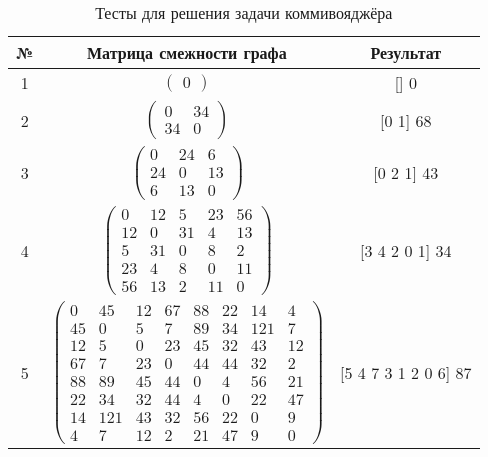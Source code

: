 \begin{table}[H]
  \caption{\label{table:tests} Тесты для решения задачи коммивояджёра}
  \begin{center}
    \begin{tabular}{|c|c|c|}
      \hline
      № &  Матрица смежности графа & Результат \\ \hline
      1 & $\begin{pmatrix}
      	0
      \end{pmatrix}$ & [] 0 \\ \hline
      2 & $\begin{pmatrix}
      	0 & 34 \\
      	34 & 0
      \end{pmatrix}$ & [0 1] 68 \\ \hline
      3 & $\begin{pmatrix}
      	0 & 24 & 6 \\
      	24 & 0 & 13 \\
      	6 & 13 & 0
      \end{pmatrix}$ & [0 2 1] 43 \\ \hline
      4 & $\begin{pmatrix}
      	0 & 12 & 5 & 23 & 56 \\
      	12 & 0 & 31 & 4 & 13 \\
      	5 & 31 & 0 & 8 & 2 \\
      	23 & 4 & 8 & 0 & 11 \\
      	56 & 13 & 2 & 11 & 0
      \end{pmatrix}$ & [3 4 2 0 1] 34  \\ \hline
      5 & $\begin{pmatrix}
      	0 & 45 & 12 & 67 & 88 & 22 & 14 & 4 \\
      	45 & 0 & 5 & 7 & 89 & 34 & 121 & 7 \\
      	12 & 5 & 0 & 23 & 45 & 32 & 43 & 12 \\
      	67 & 7 & 23 & 0 & 44 & 44 & 32 & 2 \\
      	88 & 89 & 45 & 44 & 0 & 4 & 56 & 21 \\
      	22 & 34 & 32 & 44 & 4 & 0 & 22 & 47 \\
      	14 & 121 & 43 & 32 & 56 & 22 & 0 & 9 \\
      	4 & 7 & 12 & 2 & 21 & 47 & 9 & 0
      \end{pmatrix}$ & [5 4 7 3 1 2 0 6] 87 \\ \hline
    \end{tabular}
  \end{center}
\end{table}

\newpage